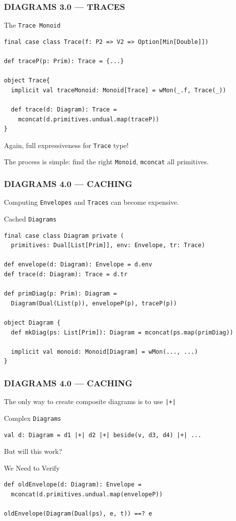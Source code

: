 \documentclass{beamer}
\begin{document}
\begin{frame}[fragile] \frametitle{DIAGRAMS 3.0 --- TRACES}
  \begin{block}{The \texttt{Trace Monoid}}
  \begin{lstlisting}
final case class Trace(f: P2 => V2 => Option[Min[Double]])

def traceP(p: Prim): Trace = {...}

object Trace{
  implicit val traceMonoid: Monoid[Trace] = wMon(_.f, Trace(_))

  def trace(d: Diagram): Trace =
    mconcat(d.primitives.undual.map(traceP))
}
  \end{lstlisting}
  \end{block}

Again, full expressiveness for \texttt{Trace} type!

The process is simple: find the right \texttt{Monoid}, \texttt{mconcat} all primitives.
\end{frame}

\begin{frame}[fragile] \frametitle{DIAGRAMS 4.0 --- CACHING}
  Computing \texttt{Envelopes} and \texttt{Traces} can become expensive.

  \begin{block}{Cached \texttt{Diagrams}}
  \begin{lstlisting}
final case class Diagram private (
  primitives: Dual[List[Prim]], env: Envelope, tr: Trace)

def envelope(d: Diagram): Envelope = d.env
def trace(d: Diagram): Trace = d.tr

def primDiag(p: Prim): Diagram =
  Diagram(Dual(List(p)), envelopeP(p), traceP(p))

object Diagram {
  def mkDiag(ps: List[Prim]): Diagram = mconcat(ps.map(primDiag))

  implicit val monoid: Monoid[Diagram] = wMon(..., ...)
}
  \end{lstlisting}
  \vspace{-.5cm}
  \end{block}
\end{frame}

\begin{frame}[fragile] \frametitle{DIAGRAMS 4.0 --- CACHING}
  The only way to create composite diagrams is to use \texttt{|+|}

  \begin{block}{Complex \texttt{Diagrams}}
  \begin{lstlisting}
val d: Diagram = d1 |+| d2 |+| beside(v, d3, d4) |+| ...
  \end{lstlisting}
  \end{block}
  But will this work?

  \begin{block}{We Need to Verify}
  \begin{lstlisting}
def oldEnvelope(d: Diagram): Envelope =
  mconcat(d.primitives.undual.map(envelopeP))

oldEnvelope(Diagram(Dual(ps), e, t)) ==? e
  \end{lstlisting}
  \end{block}
\end{frame}
\end{document}
